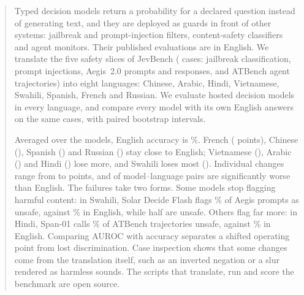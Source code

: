 \begin{abstract}
Typed decision models return a probability for a declared question instead of
generating text, and they are deployed as guards in front of other systems:
jailbreak and prompt-injection filters, content-safety classifiers and
agent monitors. Their published evaluations are in English. We translate the
five safety slices of JevBench (\MLnCasesEN{} cases: jailbreak classification,
prompt injections, Aegis~2.0 prompts and responses, and ATBench agent
trajectories) into eight languages: Chinese, Arabic, Hindi, Vietnamese,
Swahili, Spanish, French and Russian. We evaluate \MLnModels{} hosted decision
models in every language, and compare every model with its own English answers
on the same cases, with paired bootstrap intervals.

Averaged over the \MLnModels{} models, English accuracy is \MLaccEN\%. French
(\MLdeltaFR{} points), Chinese (\MLdeltaZH{}), Spanish (\MLdeltaES{}) and
Russian (\MLdeltaRU{}) stay close to English; Vietnamese (\MLdeltaVI{}), Arabic
(\MLdeltaAR{}) and Hindi (\MLdeltaHI{}) lose more, and Swahili loses most
(\MLdeltaSW{}). Individual changes range from \MLdeltaMin{} to \MLdeltaMax{}
points, and \MLsigNeg{} of \MLnPairs{} model--language pairs are significantly
worse than English. The failures take two forms. Some models stop flagging
harmful content: in Swahili, Solar Decide Flash flags
\MLyesSolarDecideFlashSWAegisPrompts\% of Aegis prompts as unsafe, against
\MLyesEnSolarDecideFlashSWAegisPrompts\% in English, while half are unsafe.
Others flag far more: in Hindi, Span-01 calls \MLyesSpanHIAtbench\% of ATBench
trajectories unsafe, against \MLyesEnSpanHIAtbench\% in English. Comparing
AUROC with accuracy separates a shifted operating point from lost
discrimination. Case inspection shows that some changes come from the
translation itself, such as an inverted negation or a slur rendered as harmless
sounds. The scripts that translate, run and score the benchmark are open source.
\end{abstract}

